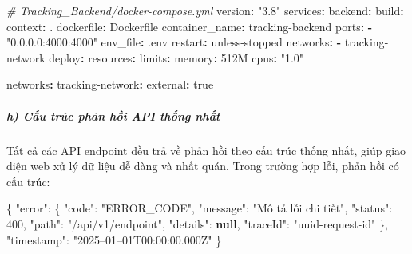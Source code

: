 \documentclass[a4paper]{extarticle}
\newenvironment{Shaded}{}{}
\newcommand{\AttributeTok}[1]{\textcolor[rgb]{0.49,0.56,0.16}{#1}}
\newcommand{\CharTok}[1]{\textcolor[rgb]{0.25,0.44,0.63}{#1}}
\newcommand{\CommentTok}[1]{\textcolor[rgb]{0.38,0.63,0.69}{\textit{#1}}}
\newcommand{\DataTypeTok}[1]{\textcolor[rgb]{0.56,0.13,0.00}{#1}}
\newcommand{\DecValTok}[1]{\textcolor[rgb]{0.25,0.63,0.44}{#1}}
\newcommand{\FunctionTok}[1]{\textcolor[rgb]{0.02,0.16,0.49}{#1}}
\newcommand{\KeywordTok}[1]{\textcolor[rgb]{0.00,0.44,0.13}{\textbf{#1}}}
\newcommand{\StringTok}[1]{\textcolor[rgb]{0.25,0.44,0.63}{#1}}
\begin{document}
\begin{Shaded}
\begin{Highlighting}[]
\CommentTok{\# Tracking\_Backend/docker{-}compose.yml}
\FunctionTok{version}\KeywordTok{:}\AttributeTok{ }\StringTok{"3.8"}
\FunctionTok{services}\KeywordTok{:}
\AttributeTok{  }\FunctionTok{backend}\KeywordTok{:}
\AttributeTok{    }\FunctionTok{build}\KeywordTok{:}
\AttributeTok{      }\FunctionTok{context}\KeywordTok{:}\AttributeTok{ .}
\AttributeTok{      }\FunctionTok{dockerfile}\KeywordTok{:}\AttributeTok{ Dockerfile}
\AttributeTok{    }\FunctionTok{container\_name}\KeywordTok{:}\AttributeTok{ tracking{-}backend}
\AttributeTok{    }\FunctionTok{ports}\KeywordTok{:}
\AttributeTok{      }\KeywordTok{{-}}\AttributeTok{ }\StringTok{"0.0.0.0:4000:4000"}
\AttributeTok{    }\FunctionTok{env\_file}\KeywordTok{:}\AttributeTok{ .env}
\AttributeTok{    }\FunctionTok{restart}\KeywordTok{:}\AttributeTok{ unless{-}stopped}
\AttributeTok{    }\FunctionTok{networks}\KeywordTok{:}
\AttributeTok{      }\KeywordTok{{-}}\AttributeTok{ tracking{-}network}
\AttributeTok{    }\FunctionTok{deploy}\KeywordTok{:}
\AttributeTok{      }\FunctionTok{resources}\KeywordTok{:}
\AttributeTok{        }\FunctionTok{limits}\KeywordTok{:}
\AttributeTok{          }\FunctionTok{memory}\KeywordTok{:}\AttributeTok{ 512M}
\AttributeTok{          }\FunctionTok{cpus}\KeywordTok{:}\AttributeTok{ }\StringTok{"1.0"}

\FunctionTok{networks}\KeywordTok{:}
\AttributeTok{  }\FunctionTok{tracking{-}network}\KeywordTok{:}
\AttributeTok{    }\FunctionTok{external}\KeywordTok{:}\AttributeTok{ }\CharTok{true}
\end{Highlighting}
\end{Shaded}

\subparagraph{h) Cấu trúc phản hồi API thống
nhất}\label{h-cux1ea5u-truxfac-response-api-thux1ed1ng-nhux1ea5t}

Tất cả các API endpoint đều trả về phản hồi theo cấu trúc thống nhất,
giúp giao diện web xử lý dữ liệu dễ dàng và nhất quán. Trong trường hợp lỗi,
phản hồi có cấu trúc:

\begin{Shaded}
\begin{Highlighting}[]
\FunctionTok{\{}
  \DataTypeTok{"error"}\FunctionTok{:} \FunctionTok{\{}
    \DataTypeTok{"code"}\FunctionTok{:} \StringTok{"ERROR\_CODE"}\FunctionTok{,}
    \DataTypeTok{"message"}\FunctionTok{:} \StringTok{"Mô tả lỗi chi tiết"}\FunctionTok{,}
    \DataTypeTok{"status"}\FunctionTok{:} \DecValTok{400}\FunctionTok{,}
    \DataTypeTok{"path"}\FunctionTok{:} \StringTok{"/api/v1/endpoint"}\FunctionTok{,}
    \DataTypeTok{"details"}\FunctionTok{:} \KeywordTok{null}\FunctionTok{,}
    \DataTypeTok{"traceId"}\FunctionTok{:} \StringTok{"uuid{-}request{-}id"}
  \FunctionTok{\},}
  \DataTypeTok{"timestamp"}\FunctionTok{:} \StringTok{"2025–01–01T00:00:00.000Z"}
\FunctionTok{\}}
\end{Highlighting}
\end{Shaded}
\end{document}
